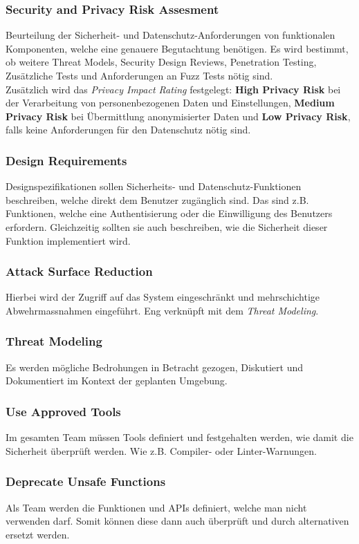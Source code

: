 \subsubsection{Security and Privacy Risk Assesment}
Beurteilung der Sicherheit- und Datenschutz-Anforderungen von funktionalen Komponenten, welche eine genauere Begutachtung benötigen. Es wird bestimmt, ob weitere Threat Models, Security Design Reviews, Penetration Testing, Zusätzliche Tests und Anforderungen an Fuzz Tests nötig sind.\\
Zusätzlich wird das \textit{Privacy Impact Rating} festgelegt: \textbf{High Privacy Risk} bei der Verarbeitung von personenbezogenen Daten und Einstellungen, \textbf{Medium Privacy Risk} bei Übermittlung anonymisierter Daten und \textbf{Low Privacy Risk}, falls keine Anforderungen für den Datenschutz nötig sind.


\subsubsection{Design Requirements}
Designspezifikationen sollen Sicherheits- und Datenschutz-Funktionen beschreiben, welche direkt dem Benutzer zugänglich sind. Das sind z.B. Funktionen, welche eine Authentisierung oder die Einwilligung des Benutzers erfordern. Gleichzeitig sollten sie auch beschreiben, wie die Sicherheit dieser Funktion implementiert wird.

\subsubsection{Attack Surface Reduction}
Hierbei wird der Zugriff auf das System eingeschränkt und mehrschichtige Abwehrmassnahmen eingeführt. Eng verknüpft mit dem \textit{Threat Modeling}.

\subsubsection{Threat Modeling}
Es werden mögliche Bedrohungen in Betracht gezogen, Diskutiert und Dokumentiert im Kontext der geplanten Umgebung.

\subsubsection{Use Approved Tools}
Im gesamten Team müssen Tools definiert und festgehalten werden, wie damit die Sicherheit überprüft werden. Wie z.B. Compiler- oder Linter-Warnungen.

\subsubsection{Deprecate Unsafe Functions}
Als Team werden die Funktionen und APIs definiert, welche man nicht verwenden darf. Somit können diese dann auch überprüft und durch alternativen ersetzt werden.

